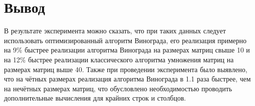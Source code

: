 \section{Вывод}
В результате эксперимента можно сказать, что при таких данных следует использовать оптимизированный алгоритм Винограда, его реализация примерно на 9\% быстрее реализации алгоритма Винограда на размерах матриц свыше 10 и на 12\% быстрее реализации классического алгоритма умножения матриц на размерах матриц выше 40.
Также при проведении эксперимента было выявлено, что на чётных размерах реализация алгоритма Винограда в 1.1 раза быстрее, чем на нечётных размерах матриц, что обусловлено необходимостью проводить дополнительные вычисления для крайних строк и столбцов.
